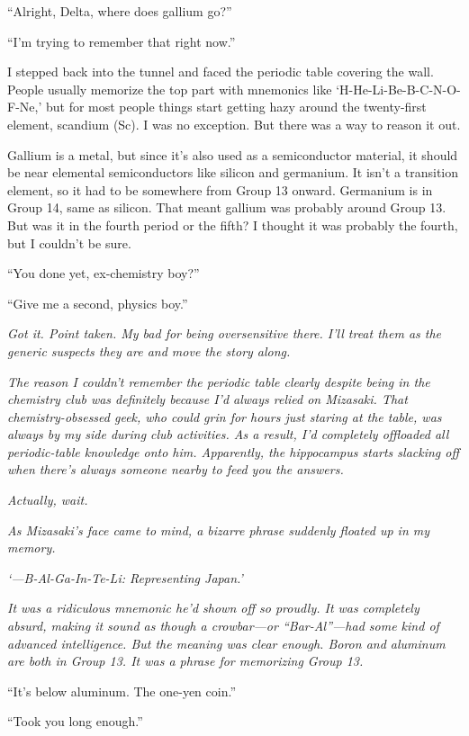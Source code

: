 \documentclass[
    a4paper,
    12pt,
    twoside,
    openany,
    UTF8,
    fontset=windows
]{ctexbook}
\begin{document}
``Alright, Delta, where does gallium go?''

``I'm trying to remember that right now.''

I stepped back into the tunnel and faced the periodic table covering the wall. People usually memorize the top part with mnemonics like `H-He-Li-Be-B-C-N-O-F-Ne,' but for most people things start getting hazy around the twenty-first element, scandium (Sc). I was no exception. But there was a way to reason it out.

Gallium is a metal, but since it's also used as a semiconductor material, it should be near elemental semiconductors like silicon and germanium. It isn't a transition element, so it had to be somewhere from Group 13 onward. Germanium is in Group 14, same as silicon. That meant gallium was probably around Group 13. But was it in the fourth period or the fifth? I thought it was probably the fourth, but I couldn't be sure.

``You done yet, ex-chemistry boy?''

``Give me a second, physics boy.''

\textit{Got it. Point taken. My bad for being oversensitive there. I'll treat them as the generic suspects they are and move the story along.}

\textit{The reason I couldn't remember the periodic table clearly despite being in the chemistry club was definitely because I'd always relied on Mizasaki. That chemistry-obsessed geek, who could grin for hours just staring at the table, was always by my side during club activities. As a result, I'd completely offloaded all periodic-table knowledge onto him. Apparently, the hippocampus starts slacking off when there's always someone nearby to feed you the answers.}

\textit{Actually, wait.}

\textit{As Mizasaki's face came to mind, a bizarre phrase suddenly floated up in my memory.}

\textit{`---B-Al-Ga-In-Te-Li: Representing Japan.'}

\textit{It was a ridiculous mnemonic he'd shown off so proudly. It was completely absurd, making it sound as though a crowbar---or ``Bar-Al''---had some kind of advanced intelligence. But the meaning was clear enough. Boron and aluminum are both in Group 13. It was a phrase for memorizing Group 13.}

``It's below aluminum. The one-yen coin.''

``Took you long enough.''
\end{document}
